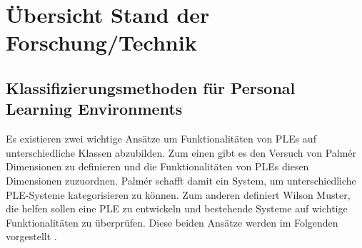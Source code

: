 \chapter{Übersicht Stand der Forschung/Technik} 
\label{Kapitel 4}

\section{Klassifizierungsmethoden für Personal Learning Environments}\label{section:klassifizierungsmethoden}
Es existieren zwei wichtige Ansätze um Funktionalitäten von PLEs auf unterschiedliche Klassen abzubilden. Zum einen gibt es den Versuch von Palmér Dimensionen zu definieren und die Funktionalitäten von PLEs diesen Dimensionen zuzuordnen. Palmér schafft damit ein System, um unterschiedliche PLE-Systeme kategorisieren zu können. Zum anderen definiert Wilson Muster, die helfen sollen eine PLE zu entwickeln und bestehende Systeme auf wichtige Funktionalitäten zu überprüfen. Diese beiden Ansätze werden im Folgenden vorgestellt .


